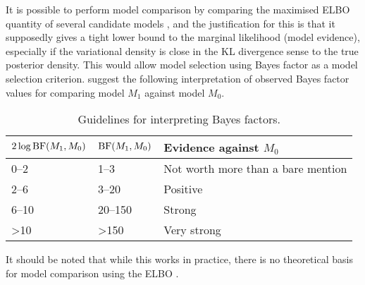 It is possible to perform model comparison by comparing the maximised ELBO quantity of several candidate models \citep{beal2003}, and the justification for this is that it supposedly gives a tight lower bound to the marginal likelihood (model evidence), especially if the variational density is close in the KL divergence sense to the true posterior density.
This would allow model selection using Bayes factor as a model selection criterion.
\citet{kass1995bayes} suggest the following interpretation of observed Bayes factor values for comparing model $M_1$ against model $M_0$.

\begin{table}[H]
  \centering
  \caption{Guidelines for interpreting Bayes factors.}
  \label{tab:bf}
  \begin{tabular}{lll}
    \toprule
    $2\log \operatorname{BF}(M_1,M_0)$ &$\operatorname{BF}(M_1,M_0)$ & Evidence against $M_0$ \\
    \midrule
    0--2  &1--3    &Not worth more than a bare mention \\ 
    2--6  &3--20   &Positive \\ 
    6--10 &20--150 &Strong \\ 
    >10   &>150    &Very strong \\ 
  \end{tabular}
\end{table}
\vspace{-1.4em}
\noindent It should be noted that while this works in practice, there is no theoretical basis for model comparison using the ELBO \citep{blei2017variational}.


